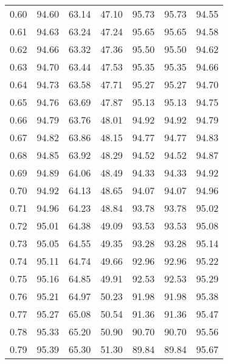 \begin{tabular}{|c|c|c|c|c|c|c|}
      0.60 &     94.60 &     63.14 &      47.10 &   95.73 &      95.73 &         94.55 \\
      0.61 &     94.63 &     63.24 &      47.24 &   95.65 &      95.65 &         94.58 \\
      0.62 &     94.66 &     63.32 &      47.36 &   95.50 &      95.50 &         94.62 \\
      0.63 &     94.70 &     63.44 &      47.53 &   95.35 &      95.35 &         94.66 \\
      0.64 &     94.73 &     63.58 &      47.71 &   95.27 &      95.27 &         94.70 \\
      0.65 &     94.76 &     63.69 &      47.87 &   95.13 &      95.13 &         94.75 \\
      0.66 &     94.79 &     63.76 &      48.01 &   94.92 &      94.92 &         94.79 \\
      0.67 &     94.82 &     63.86 &      48.15 &   94.77 &      94.77 &         94.83 \\
      0.68 &     94.85 &     63.92 &      48.29 &   94.52 &      94.52 &         94.87 \\
      0.69 &     94.89 &     64.06 &      48.49 &   94.33 &      94.33 &         94.92 \\
      0.70 &     94.92 &     64.13 &      48.65 &   94.07 &      94.07 &         94.96 \\
      0.71 &     94.96 &     64.23 &      48.84 &   93.78 &      93.78 &         95.02 \\
      0.72 &     95.01 &     64.38 &      49.09 &   93.53 &      93.53 &         95.08 \\
      0.73 &     95.05 &     64.55 &      49.35 &   93.28 &      93.28 &         95.14 \\
      0.74 &     95.11 &     64.74 &      49.66 &   92.96 &      92.96 &         95.22 \\
      0.75 &     95.16 &     64.85 &      49.91 &   92.53 &      92.53 &         95.29 \\
      0.76 &     95.21 &     64.97 &      50.23 &   91.98 &      91.98 &         95.38 \\
      0.77 &     95.27 &     65.08 &      50.54 &   91.36 &      91.36 &         95.47 \\
      0.78 &     95.33 &     65.20 &      50.90 &   90.70 &      90.70 &         95.56 \\
      0.79 &     95.39 &     65.30 &      51.30 &   89.84 &      89.84 &         95.67 \\

\end{tabular}
